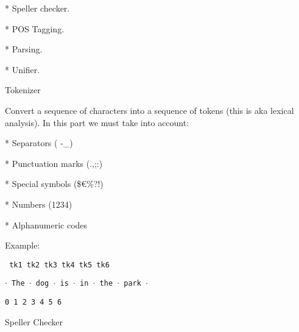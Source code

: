 \documentclass[a4paper,10pt]{article}
\begin{document}
* Speller checker.

* POS Tagging.

* Parsing.

* Unifier.

Tokenizer

Convert a sequence of characters into a sequence of tokens (this is aka lexical analysis). In this part we must take into account:

* Separators ( -\_)

* Punctuation marks (.,;:)

* Special symbols (\$\euro \%?!)

* Numbers (1234)

* Alphanumeric codes

Example:

\texttt{  tk1   tk2   tk3  tk4  tk5   tk6}
  
\texttt{$\cdot$ The $\cdot$ dog $\cdot$ is $\cdot$ in $\cdot$ the $\cdot$ park $\cdot$}

\texttt{0     1     2    3    4     5      6}

Speller Checker
\end{document}
